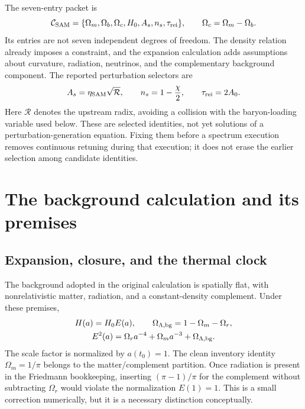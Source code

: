 The seven-entry packet is
\begin{equation}
\mathcal C_{\rm SAM}=\{\Omega_m,\Omega_b,\Omega_c,H_0,A_s,n_s,\tau_{\rm rei}\},\qquad
\Omega_c=\Omega_m-\Omega_b.
\label{c9:packet}
\end{equation}
Its entries are not seven independent degrees of freedom. The density relation already imposes a constraint, and the expansion calculation adds assumptions about curvature, radiation, neutrinos, and the complementary background component. The reported perturbation selectors are
\begin{equation}
 A_s=\eta_{\rm SAM}\sqrt{\mathcal R},\qquad
 n_s=1-\frac{\chi}{2},\qquad \tau_{\rm rei}=2A_0.
\label{c9:selectors}
\end{equation}
Here $\mathcal R$ denotes the upstream radix, avoiding a collision with the baryon-loading variable used below. These are selected identities, not yet solutions of a perturbation-generation equation. Fixing them before a spectrum execution removes continuous retuning during that execution; it does not erase the earlier selection among candidate identities.

\section{The background calculation and its premises}
\subsection{Expansion, closure, and the thermal clock}

The background adopted in the original calculation is spatially flat, with nonrelativistic matter, radiation, and a constant-density complement. Under these premises,
\begin{equation}
 \begin{gathered}
 H(a)=H_0 E(a),\qquad \Omega_{\Lambda,{\rm bg}}=1-\Omega_m-\Omega_r,\\
 E^2(a)=\Omega_r a^{-4}+\Omega_m a^{-3}+\Omega_{\Lambda,{\rm bg}}.
 \end{gathered}
\label{c9:background}
\end{equation}
The scale factor is normalized by $a(t_0)=1$. The clean inventory identity $\Omega_m=1/\pi$ belongs to the matter/complement partition. Once radiation is present in the Friedmann bookkeeping, inserting $(\pi-1)/\pi$ for the complement without subtracting $\Omega_r$ would violate the normalization $E(1)=1$. This is a small correction numerically, but it is a necessary distinction conceptually.

